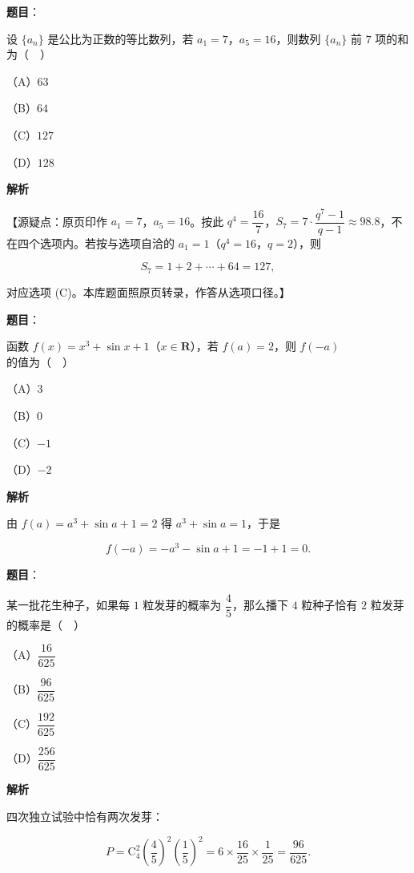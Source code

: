 \begin{answer}

\textbf{题目}：

设 $\{a_n\}$ 是公比为正数的等比数列，若 $a_1=7$，$a_5=16$，则数列 $\{a_n\}$ 前 $7$ 项的和为（　）

（A）$63$

（B）$64$

（C）$127$

（D）$128$

\textbf{解析}

【源疑点：原页印作 $a_1=7$，$a_5=16$。按此 $q^4=\dfrac{16}7$，$S_7=7\cdot\dfrac{q^7-1}{q-1}\approx98.8$，不在四个选项内。若按与选项自洽的 $a_1=1$（$q^4=16$，$q=2$），则

\nopagebreak[4]
\[S_7=1+2+\cdots+64=127,\]

对应选项 (C)。本库题面照原页转录，作答从选项口径。】


\end{answer}
\begin{answer}

\textbf{题目}：

函数 $f(x)=x^3+\sin x+1$（$x\in\mathbf R$），若 $f(a)=2$，则 $f(-a)$ 的值为（　）

（A）$3$

（B）$0$

（C）$-1$

（D）$-2$

\textbf{解析}

由 $f(a)=a^3+\sin a+1=2$ 得 $a^3+\sin a=1$，于是

\nopagebreak[4]
\[f(-a)=-a^3-\sin a+1=-1+1=0.\]


\end{answer}
\begin{answer}

\textbf{题目}：

某一批花生种子，如果每 $1$ 粒发芽的概率为 $\dfrac45$，那么播下 $4$ 粒种子恰有 $2$ 粒发芽的概率是（　）

（A）$\dfrac{16}{625}$

（B）$\dfrac{96}{625}$

（C）$\dfrac{192}{625}$

（D）$\dfrac{256}{625}$

\textbf{解析}

四次独立试验中恰有两次发芽：

\nopagebreak[4]
\[P=\mathrm C_4^2\left(\frac45\right)^2\left(\frac15\right)^2=6\times\frac{16}{25}\times\frac1{25}=\frac{96}{625}.\]


\end{answer}
